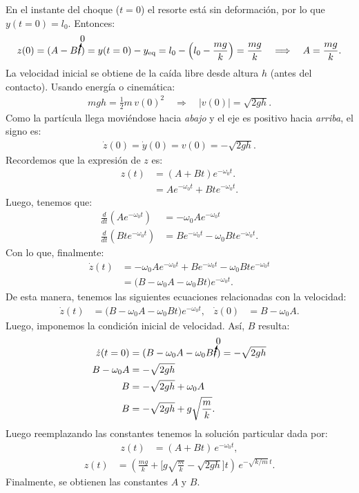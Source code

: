 \documentclass[
  11pt,
  letterpaper,
   addpoints,
  ]{exam}
\begin{document}
\begin{questions}
\begin{solution}
En el instante del choque ($t=0$) el resorte está sin deformación, por lo que $y(t=0)=l_0$. Entonces:
\begin{align}
z(0)=(A - B\cancelto{0}{t})=y(t=0)-y_{\text{eq}}=l_0-\Big(l_0-\frac{mg}{k}\Big)=\frac{mg}{k}
\quad\Longrightarrow\quad
A=\frac{mg}{k}.
\end{align}
La velocidad inicial se obtiene de la caída libre desde altura $h$ (antes del contacto). Usando energía o cinemática:
\begin{align}
mgh=\frac{1}{2}m\,v(0)^2
\quad\Longrightarrow\quad
|v(0)|=\sqrt{2gh}.
\end{align}
Como la partícula llega moviéndose hacia \emph{abajo} y el eje es positivo hacia \emph{arriba}, el signo es:
\begin{align}
\dot z(0)=\dot y(0)=v(0)=-\sqrt{2gh}.
\end{align}
Recordemos que la expresión de $z$ es:
\begin{align}
z(t)&=(A+Bt)e^{-\omega_0 t}.\\
 &= Ae^{-\omega_0 t} + Bte^{-\omega_0 t}.
\end{align}
Luego, tenemos que:
\begin{align}
  \frac{d}{dt}\!\left( A e^{-\omega_0 t}\right) &= -\omega_0 A e^{-\omega_0 t}\\
  \frac{d}{dt}\!\left( B t e^{-\omega_0 t}\right) &= B e^{-\omega_0 t} - \omega_0 B t e^{-\omega_0 t}.
\end{align}
Con lo que, finalmente:
\begin{align}
  \dot z(t) &= -\omega_0 A e^{-\omega_0 t} + B e^{-\omega_0 t} - \omega_0 B t e^{-\omega_0 t}\\
  &= \big(B - \omega_0 A - \omega_0 B t\big)e^{-\omega_0 t}.
\end{align}
De esta manera, tenemos las siguientes ecuaciones relacionadas con la velocidad:
\begin{align}
\dot z(t)&=\big(B-\omega_0A-\omega_0Bt\big)e^{-\omega_0 t},
&
\dot z(0)&=B-\omega_0A.
\end{align}
Luego, imponemos la condición inicial de velocidad. Así, $B$ resulta:
\begin{align}
\dot z(t=0)&= (B - \omega_0 A -\omega_0 B \cancelto{0}{t}) = -\sqrt{2gh}\\
B-\omega_0 A&=-\sqrt{2gh}\\
B&=-\sqrt{2gh}+\omega_0 A\\
B&=-\sqrt{2gh}+g\sqrt{\frac{m}{k}}.
\end{align}
Luego reemplazando las constantes tenemos la solución particular dada por:
\begin{align}
z(t) &= (A + Bt)\,e^{-\omega_0 t},
\end{align}
\begin{align}
z(t) &= \boxed{\left(\frac{mg}{k}+\Big[g\sqrt{\frac{m}{k}}-\sqrt{2gh}\Big]t\right)\,e^{-\sqrt{k/m}\,t}}.
\end{align}
Finalmente, se obtienen las constantes $A$ y $B$.

\end{solution}
\end{questions}
\end{document}
